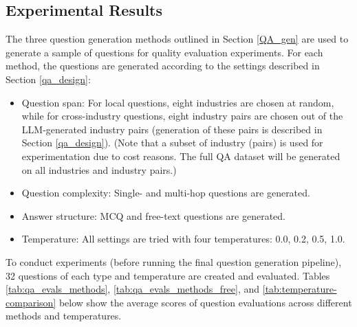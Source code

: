 \subsection{Experimental Results}\label{qa_experiment_results}

The three question generation methods outlined in Section \ref{QA_gen} are used to generate a sample of questions for quality evaluation experiments. For each method, the questions are generated according to the settings described in Section \ref{qa_design}:
\begin{itemize}
    \item Question span: For local questions, eight industries are chosen at random, while for cross-industry questions, eight industry pairs are chosen out of the LLM-generated industry pairs (generation of these pairs is described in Section \ref{qa_design}). (Note that a subset of industry (pairs) is used for experimentation due to cost reasons. The full QA dataset will be generated on all industries and industry pairs.)
    \item Question complexity: Single- and multi-hop questions are generated.
    \item Answer structure: MCQ and free-text questions are generated.
    \item Temperature: All settings are tried with four temperatures: 0.0, 0.2, 0.5, 1.0.
\end{itemize}

To conduct experiments (before running the final question generation pipeline), 32 questions of each type and temperature are created and evaluated. Tables \ref{tab:qa_evals_methods}, \ref{tab:qa_evals_methods_free}, and \ref{tab:temperature-comparison} below show the average scores of question evaluations across different methods and temperatures.


